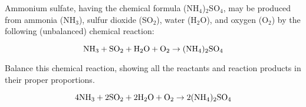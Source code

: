 

Ammonium sulfate, having the chemical formula (NH$_{4}$)$_{2}$SO$_{4}$, may be produced from ammonia (NH$_{3}$), sulfur dioxide (SO$_{2}$), water (H$_{2}$O), and oxygen (O$_{2}$) by the following (unbalanced) chemical reaction:

$$\hbox{NH}_3 + \hbox{SO}_2 + \hbox{H}_2\hbox{O} + \hbox{O}_2 \to (\hbox{NH}_4)_2\hbox{SO}_4$$

Balance this chemical reaction, showing all the reactants and reaction products in their proper proportions.







$$4\hbox{NH}_3 + 2\hbox{SO}_2 + 2\hbox{H}_2\hbox{O} + \hbox{O}_2 \to 2(\hbox{NH}_4)_2\hbox{SO}_4$$











